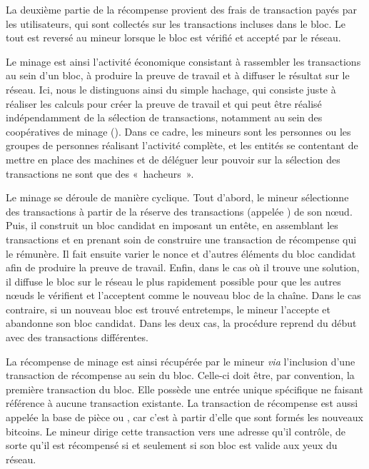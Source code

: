 La deuxième partie de la récompense provient des frais de transaction payés par les utilisateurs, qui sont collectés sur les transactions incluses dans le bloc. Le tout est reversé au mineur lorsque le bloc est vérifié et accepté par le réseau. %

Le minage est ainsi l'activité économique consistant à rassembler les transactions au sein d'un bloc, à produire la preuve de travail et à diffuser le résultat sur le réseau. Ici, nous le distinguons ainsi du simple hachage, qui consiste juste à réaliser les calculs pour créer la preuve de travail et qui peut être réalisé indépendamment de la sélection de transactions, notamment au sein des coopératives de minage (). Dans ce cadre, les mineurs sont les personnes ou les groupes de personnes réalisant l'activité complète, et les entités se contentant de mettre en place des machines et de déléguer leur pouvoir sur la sélection des transactions ne sont que des «~hacheurs~».


Le minage se déroule de manière cyclique. Tout d'abord, le mineur sélectionne des transactions à partir de la réserve des transactions (appelée ) de son nœud. Puis, il construit un bloc candidat en imposant un entête, en assemblant les transactions et en prenant soin de construire une transaction de récompense qui le rémunère. Il fait ensuite varier le nonce et d'autres éléments du bloc candidat afin de produire la preuve de travail. Enfin, dans le cas où il trouve une solution, il diffuse le bloc sur le réseau le plus rapidement possible pour que les autres nœuds le vérifient et l'acceptent comme le nouveau bloc de la chaîne. Dans le cas contraire, si un nouveau bloc est trouvé entretemps, le mineur l'accepte et abandonne son bloc candidat. Dans les deux cas, la procédure reprend du début avec des transactions différentes.

La récompense de minage est ainsi récupérée par le mineur \emph{via} l'inclusion d'une transaction de récompense au sein du bloc. Celle-ci doit être, par convention, la première transaction du bloc. Elle possède une entrée unique spécifique ne faisant référence à aucune transaction existante. La transaction de récompense est aussi appelée la base de pièce ou , car c'est à partir d'elle que sont formés les nouveaux bitcoins. Le mineur dirige cette transaction vers une adresse qu'il contrôle, de sorte qu'il est récompensé si et seulement si son bloc est valide aux yeux du réseau.


